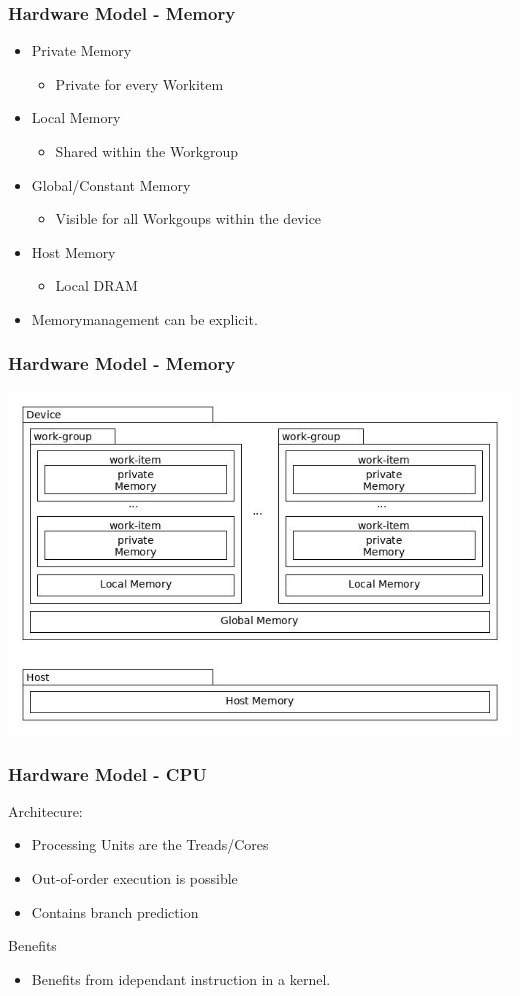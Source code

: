 \documentclass{beamer}
\begin{document}
\begin{frame}
    \frametitle{Hardware Model - Memory}
        \begin{itemize}
            \item Private Memory
            \begin{itemize}
             \item Private for every Workitem
            \end{itemize}
            \item Local Memory
            \begin{itemize}
             \item Shared within the Workgroup
            \end{itemize}
            \item Global/Constant Memory
            \begin{itemize}
             \item Visible for all Workgoups within the device
            \end{itemize}
            \item Host Memory
            \begin{itemize}
             \item Local DRAM
            \end{itemize}
            \item Memorymanagement can be explicit.
        \end{itemize}
\end{frame}
\begin{frame}
    \frametitle{Hardware Model - Memory}
        \includegraphics[width=.8\textwidth]{res/OpenCLMemoryStructure.jpg}
        
\end{frame}
\begin{frame}
    \frametitle{Hardware Model - CPU}
    Architecure:
    \begin{itemize}
        \item Processing Units are the Treads/Cores
        \item Out-of-order execution is possible
        \item Contains branch prediction
    \end{itemize}
    Benefits
    \begin{itemize}
        \item Benefits from idependant instruction in a kernel.
    \end{itemize}
\end{frame}
\end{document}
